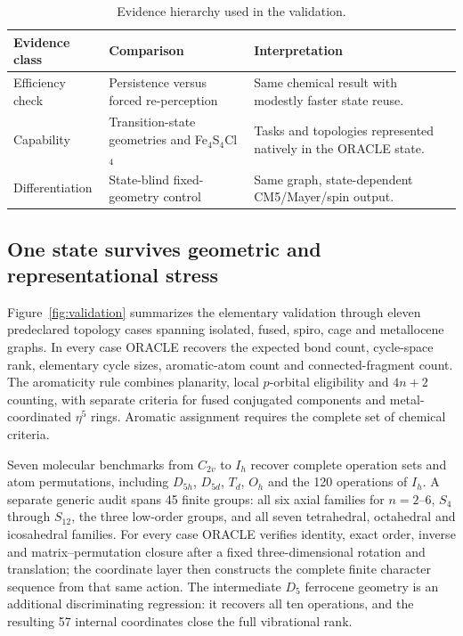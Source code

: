 \documentclass[journal=jctcce,manuscript=article]{achemso}
\begin{document}
\begin{table}[t]
\centering
\scriptsize
\caption{Evidence hierarchy used in the validation.}
\label{tab:evidence-hierarchy}
\begin{tabularx}{\linewidth}{@{}lXX@{}}
\toprule
Evidence class & Comparison & Interpretation \\
\midrule
Efficiency check & Persistence versus forced re-perception & Same chemical result with modestly faster state reuse. \\
Capability & Transition-state geometries and Fe$_4$S$_4$Cl$_4$ & Tasks and topologies represented natively in the ORACLE state. \\
Differentiation & State-blind fixed-geometry control & Same graph, state-dependent CM5/Mayer/spin output. \\
\bottomrule
\end{tabularx}
\end{table}

\subsection{One state survives geometric and representational stress}

Figure~\ref{fig:validation} summarizes the elementary validation through
eleven predeclared topology cases spanning isolated, fused, spiro, cage and
metallocene graphs.  In every case ORACLE recovers the expected bond count,
cycle-space rank, elementary cycle sizes, aromatic-atom count and
connected-fragment count.  The aromaticity
rule combines planarity, local $p$-orbital eligibility and $4n+2$ counting,
with separate criteria for fused conjugated components and
metal-coordinated $\eta^5$ rings.  Aromatic assignment requires the complete
set of chemical criteria.

Seven molecular benchmarks from $C_{2v}$ to $I_h$ recover complete operation
sets and atom permutations, including $D_{5h}$, $D_{5d}$, $T_d$, $O_h$ and the
120 operations of $I_h$.  A separate generic audit spans 45 finite groups:
all six axial families for $n=2$--6, $S_4$ through $S_{12}$, the three
low-order groups, and all seven tetrahedral, octahedral and icosahedral
families.  For every case ORACLE verifies identity, exact order, inverse and
matrix--permutation closure after a fixed three-dimensional rotation and
translation; the coordinate layer then constructs the complete finite character sequence
from that same action.  The intermediate $D_5$ ferrocene geometry is an
additional discriminating regression: it recovers all ten operations, and the
resulting 57 internal coordinates close the full vibrational rank.
\end{document}
